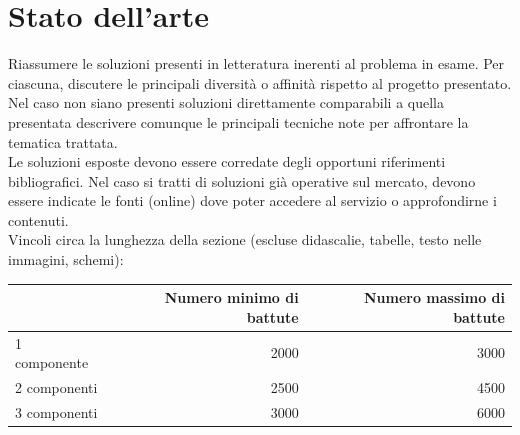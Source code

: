 \documentclass[12pt]{article}
\begin{document}
\newpage


\section{Stato dell'arte}

Riassumere le soluzioni presenti in letteratura inerenti al problema in esame. Per ciascuna, discutere le principali diversità o affinità rispetto al progetto presentato. Nel caso non siano presenti soluzioni direttamente comparabili a quella presentata descrivere comunque le principali tecniche note per affrontare la tematica trattata.\\

Le soluzioni esposte devono essere corredate degli opportuni riferimenti bibliografici. Nel caso si tratti di soluzioni già operative sul mercato, devono essere indicate le fonti (online) dove poter accedere al servizio o approfondirne i contenuti.\\


Vincoli circa la lunghezza della sezione (escluse didascalie, tabelle, testo nelle immagini, schemi):

\vspace{1cm}
\begin{tabular}{l|rr}
 & Numero minimo di battute & Numero massimo di battute \\
 \hline
 1 componente & 2000 & 3000 \\
 2 componenti & 2500 & 4500 \\
 3 componenti & 3000 & 6000 \\
 \hline
\end{tabular}
\end{document}
